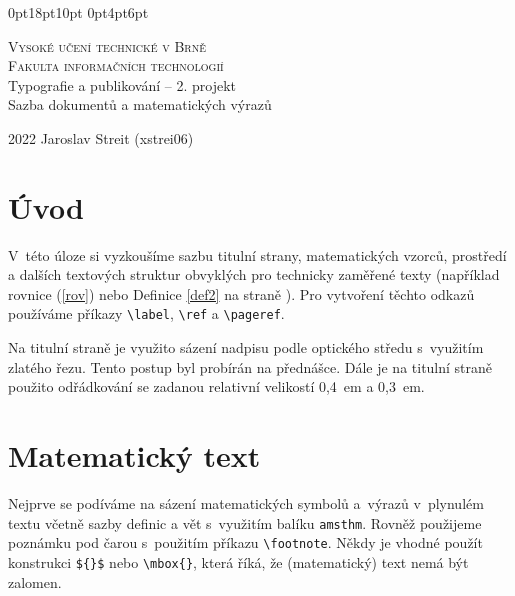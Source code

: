 \documentclass[twocolumn,11pt,a4paper]{article}
\begin{document}
\titlespacing*{\section}
{0pt}{18pt}{10pt}
\titlespacing*{\subsection}
{0pt}{4pt}{6pt}
\begin{titlepage}
    \begin{center}
        \Huge
        \textsc{
        Vysoké učení technické v Brně\\
        \huge
        Fakulta informačních technologií}\\
        \LARGE
        Typografie a publikování -- 2. projekt\\
        Sazba dokumentů a matematických výrazů
    \end{center}
    {\Large 2022 \hfill Jaroslav Streit (xstrei06)}
\end{titlepage}

\section*{Úvod}

V~této úloze si vyzkoušíme sazbu titulní strany, matematic\-kých vzorců, prostředí a dalších textových struktur obvyklých pro technicky zaměřené texty (například rovnice (\ref{rov}) nebo Definice \ref{def2} na straně \pageref{def2}). Pro vytvoření těchto odkazů používáme příkazy \verb=\label=, \verb=\ref= a \verb=\pageref=.

Na titulní straně je využito sázení nadpisu podle op\-tického středu s~využitím zlatého řezu. Tento postup byl probírán na přednášce. Dále je na titulní straně použito odřádkování se zadanou relativní velikostí 0,4~em a 0,3~em.

\section{Matematický text}

Nejprve se podíváme na sázení matematických symbolů a~výrazů v~plynulém textu včetně sazby definic a vět s~vy\-užitím balíku \texttt{amsthm}. Rovněž použijeme poznámku pod čarou s~použitím příkazu \verb=\footnote=. Někdy je vhodné použít konstrukci \verb=${}$= nebo \verb=\mbox{}=, která říká, že (matematický) text nemá být zalomen.
\end{document}
